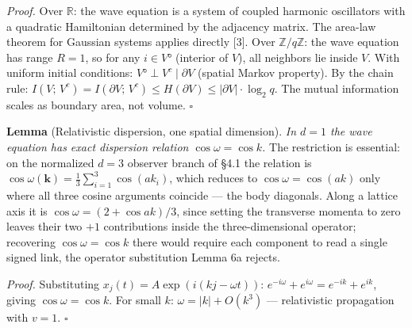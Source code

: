 \documentclass[
]{article}
\begin{document}
\emph{Proof.} Over \(\mathbb{R}\): the wave equation is a system of
coupled harmonic oscillators with a quadratic Hamiltonian determined by
the adjacency matrix. The area-law theorem for Gaussian systems applies
directly {[}3{]}. Over \(\mathbb{Z}/q\mathbb{Z}\): the wave equation has
range \(R = 1\), so for any \(i \in V°\) (interior of \(V\)), all
neighbors lie inside \(V\). With uniform initial conditions:
\(V° \perp V^c \mid \partial V\) (spatial Markov property). By the chain
rule:
\(I(V;\, V^c) = I(\partial V;\, V^c) \leq H(\partial V) \leq |\partial V| \cdot \log_2 q\).
The mutual information scales as boundary area, not volume. \(\square\)

\textbf{Lemma} (Relativistic dispersion, one spatial dimension).
\emph{In \(d=1\) the wave equation has exact dispersion relation
\(\cos\omega = \cos k\).} The restriction is essential: on the
normalized \(d=3\) observer branch of §4.1 the relation is
\(\cos\omega(\mathbf k)=\tfrac13\sum_{i=1}^{3}\cos(ak_i)\), which
reduces to \(\cos\omega=\cos(ak)\) only where all three cosine arguments
coincide --- the body diagonals. Along a lattice axis it is
\(\cos\omega=(2+\cos ak)/3\), since setting the transverse momenta to
zero leaves their two \(+1\) contributions inside the three-dimensional
operator; recovering \(\cos\omega=\cos k\) there would require each
component to read a single signed link, the operator substitution Lemma
6a rejects.

\emph{Proof.} Substituting \(x_j(t) = A\exp(i(kj - \omega t))\):
\(e^{-i\omega} + e^{i\omega} = e^{-ik} + e^{ik}\), giving
\(\cos\omega = \cos k\). For small \(k\): \(\omega = |k| + O(k^3)\) ---
relativistic propagation with \(v = 1\). \(\square\)
\end{document}
